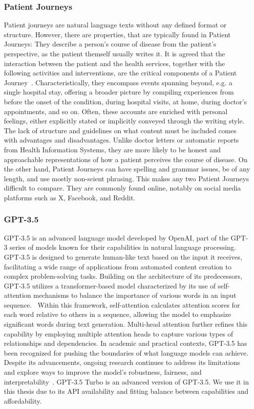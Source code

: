 \subsubsection*{Patient Journeys}\label{sec:pj}
Patient journeys are natural language texts without any defined format or structure. However, there are properties, that are typically found in Patient Journeys: They describe a person's course of disease from the patient's perspective, as the patient themself usually writes it. It is agreed that the interaction between the patient and the health services, together with the following activities and interventions, are the critical components of a Patient Journey~\cite{ferrara_engaging_2019, kuo_rosacea_2015}. Characteristically, they encompass events spanning beyond, e.g. a single hospital stay, offering a broader picture by compiling experiences from before the onset of the condition, during hospital visits, at home, during doctor's appointments, and so on. Often, these accounts are enriched with personal feelings, either explicitly stated or implicitly conveyed through the writing style. The lack of structure and guidelines on what content must be included comes with advantages and disadvantages. Unlike doctor letters or automatic reports from Health Information Systems, they are more likely to be honest and approachable representations of how a patient perceives the course of disease.
On the other hand, Patient Journeys can have spelling and grammar issues, be of any length, and use mostly non-scient phrasing. This makes any two Patient Journeys difficult to compare. They are commonly found online, notably on social media platforms such as X, Facebook, and Reddit.

\subsubsection*{GPT-3.5}\label{sec:gpt3.5}
GPT-3.5 is an advanced language model developed by OpenAI, part of the GPT-3 series of models known for their capabilities in natural language processing. GPT-3.5 is designed to generate human-like text based on the input it receives, facilitating a wide range of applications from automated content creation to complex problem-solving tasks. Building on the architecture of its predecessors, GPT-3.5 utilizes a transformer-based model characterized by its use of self-attention mechanisms to balance the importance of various words in an input sequence.~\cite{latif_fine-tuning_2024} Within this framework, self-attention calculates attention scores for each word relative to others in a sequence, allowing the model to emphasize significant words during text generation. Multi-head attention further refines this capability by employing multiple attention heads to capture various types of relationships and dependencies. In academic and practical contexts, GPT-3.5 has been recognized for pushing the boundaries of what language models can achieve. Despite its advancements, ongoing research continues to address its limitations and explore ways to improve the model's robustness, fairness, and interpretability~\cite {brown_language_2020}. GPT-3.5 Turbo is an advanced version of GPT-3.5. We use it in this thesis due to its API availability and fitting balance between capabilities and affordability.

